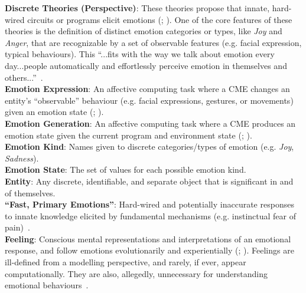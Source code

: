 \noindent\textbf{Discrete Theories (Perspective)}: These theories propose that 
innate, hard-wired circuits or programs elicit emotions 
(; ). One of the core 
features of these theories is the definition of distinct
emotion categories or types, like \textit{Joy} and \textit{Anger}, that are
recognizable by a set of observable features (e.g. facial expression, typical
behaviours). This ``...fits with the way we talk about emotion every
day...people automatically and effortlessly perceive emotion in themselves and
others...''~\citep[p.~47--48]{barrett2006emotions}. \\

\noindent\textbf{Emotion Expression}: An affective computing task where a CME
changes an entity's ``observable'' behaviour (e.g. facial expressions,
gestures, or movements) given an emotion state (;
). \\

\noindent\textbf{Emotion Generation}: An affective computing task where a CME
produces an emotion state given the current program and environment state
(; ). \\

\noindent\textbf{Emotion Kind}: Names given to discrete categories/types of
emotion (e.g. \textit{Joy}, \textit{Sadness}). \\

\noindent\textbf{Emotion State}: The set of values for each possible emotion
kind. \\

\noindent\textbf{Entity}: Any discrete, identifiable, and separate object that
is significant in and of themselves. \\

\noindent\textbf{``Fast, Primary Emotions''}: Hard-wired and potentially 
inaccurate responses to innate knowledge elicited by fundamental mechanisms 
(e.g. instinctual fear of pain)~\citep[p.~60--70]{picard1997affective}. \\

\noindent\textbf{Feeling}: Conscious mental representations and interpretations
of an emotional response, and follow emotions evolutionarily and experientially
(; ).
Feelings are ill-defined from a modelling perspective, and rarely, if ever,
appear computationally. They are also, allegedly, unnecessary for understanding
emotional behaviours~\citep{fellous2004human}. \\

